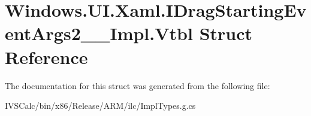 \hypertarget{struct_windows_1_1_u_i_1_1_xaml_1_1_i_drag_starting_event_args2_____impl_1_1_vtbl}{}\section{Windows.\+U\+I.\+Xaml.\+I\+Drag\+Starting\+Event\+Args2\+\_\+\+\_\+\+Impl.\+Vtbl Struct Reference}
\label{struct_windows_1_1_u_i_1_1_xaml_1_1_i_drag_starting_event_args2_____impl_1_1_vtbl}


The documentation for this struct was generated from the following file\+:\begin{DoxyCompactItemize}
\item 
I\+V\+S\+Calc/bin/x86/\+Release/\+A\+R\+M/ilc/Impl\+Types.\+g.\+cs\end{DoxyCompactItemize}
